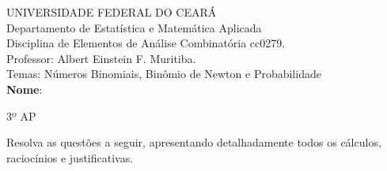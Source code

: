 \documentclass[a4paper,12pt]{article}  %
\begin{document}
\thispagestyle{empty}

UNIVERSIDADE FEDERAL DO CEARÁ\\
Departamento de Estatística e Matemática Aplicada\\
Disciplina de Elementos de Análise Combinatória cc0279.\\
Professor: Albert Einstein F. Muritiba.\\
Temas: Números Binomiais, Binômio de Newton e Probabilidade\\[0.2cm]
\textbf{Nome}: \makebox[380pt]{\hrulefill} \vspace{2pt}
\begin{center}
	3º AP
\end{center}
Resolva as questões a seguir, apresentando detalhadamente todos os cálculos, raciocínios e justificativas.
\end{document}

